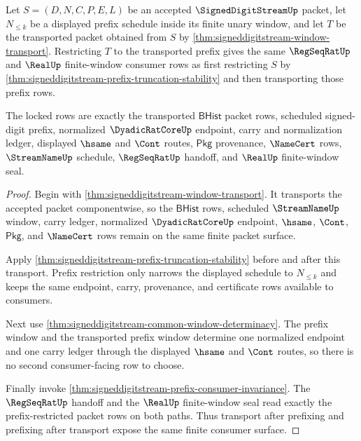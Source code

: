 \begin{theorem}
\label{thm:signeddigitstream-prefix-window-transport-lock}
Let $S=(D,N,C,P,E,L)$ be an accepted $\SignedDigitStreamUp$ packet, let
$N_{\leq k}$ be a displayed prefix schedule inside its finite unary window, and
let $T$ be the transported packet obtained from $S$ by
\autoref{thm:signeddigitstream-window-transport}. Restricting $T$ to the
transported prefix gives the same $\RegSeqRatUp$ and $\RealUp$ finite-window
consumer rows as first restricting $S$ by
\autoref{thm:signeddigitstream-prefix-truncation-stability} and then
transporting those prefix rows.

The locked rows are exactly the transported $\mathsf{BHist}$ packet rows,
scheduled signed-digit prefix, normalized $\DyadicRatCoreUp$ endpoint, carry and
normalization ledger, displayed $\hsame$ and $\Cont$ routes, $\mathsf{Pkg}$
provenance, $\NameCert$ rows, $\StreamNameUp$ schedule, $\RegSeqRatUp$ handoff,
and $\RealUp$ finite-window seal.
\end{theorem}
\begin{proof}
Begin with \autoref{thm:signeddigitstream-window-transport}. It transports the
accepted packet componentwise, so the $\mathsf{BHist}$ rows, scheduled
$\StreamNameUp$ window, carry ledger, normalized $\DyadicRatCoreUp$ endpoint,
$\hsame$, $\Cont$, $\mathsf{Pkg}$, and $\NameCert$ rows remain on the same
finite packet surface.

Apply \autoref{thm:signeddigitstream-prefix-truncation-stability} before and
after this transport. Prefix restriction only narrows the displayed schedule to
$N_{\leq k}$ and keeps the same endpoint, carry, provenance, and certificate rows
available to consumers.

Next use \autoref{thm:signeddigitstream-common-window-determinacy}. The prefix
window and the transported prefix window determine one normalized endpoint and
one carry ledger through the displayed $\hsame$ and $\Cont$ routes, so there is
no second consumer-facing row to choose.

Finally invoke \autoref{thm:signeddigitstream-prefix-consumer-invariance}. The
$\RegSeqRatUp$ handoff and the $\RealUp$ finite-window seal read exactly the
prefix-restricted packet rows on both paths. Thus transport after prefixing and
prefixing after transport expose the same finite consumer surface.
\end{proof}

